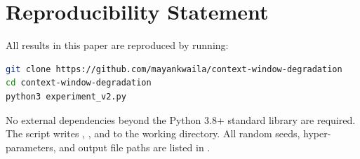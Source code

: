 \documentclass[sigconf,nonacm]{acmart}
\begin{document}
\section*{Reproducibility Statement}

All results in this paper are reproduced by running:
\begin{lstlisting}[language=bash]
git clone https://github.com/mayankwaila/context-window-degradation
cd context-window-degradation
python3 experiment_v2.py
\end{lstlisting}
No external dependencies beyond the Python 3.8+ standard library are required.
The script writes , ,
and  to the working directory.
All random seeds, hyper-parameters, and output file paths are listed in
.



\end{document}
